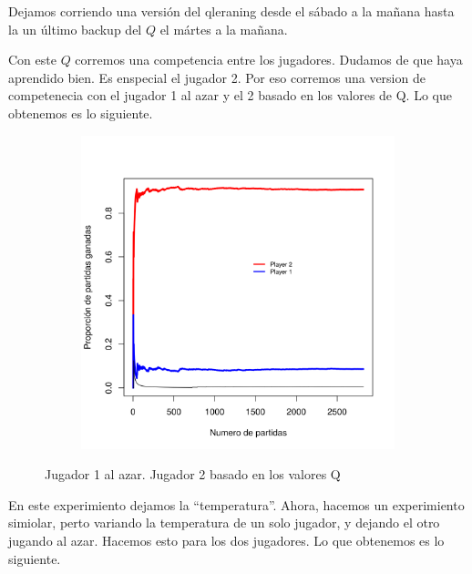 \documentclass[11pt, spanish]{article}
\begin{document}
Dejamos corriendo una versi\'on del qleraning desde el s\'abado a la ma\~nana hasta la un \'ultimo backup del $Q$ el m\'artes a la mañana. 

Con este $Q$ corremos una competencia entre los jugadores. Dudamos de que haya aprendido bien. Es enspecial el jugador 2. Por eso corremos una version de competenecia con el jugador 1 al azar y el 2 basado en los valores de Q. Lo que obtenemos es lo siguiente. 


\begin{figure}[H]
    \centering
    \begin{subfigure}[b]{0.45\textwidth}
      \includegraphics[width=\textwidth]{Imagenes/SinVision_luchaNoLibre_QsinVison_reverse}
    \end{subfigure}
    \caption{Jugador 1 al azar. Jugador 2 basado en los valores Q}
\end{figure}

En este experimiento dejamos la ``temperatura''. Ahora, hacemos un experimiento simiolar, perto variando la temperatura de un solo jugador, y dejando el otro jugando al azar. Hacemos esto para los dos jugadores. Lo que obtenemos es lo siguiente. 
\end{document}
